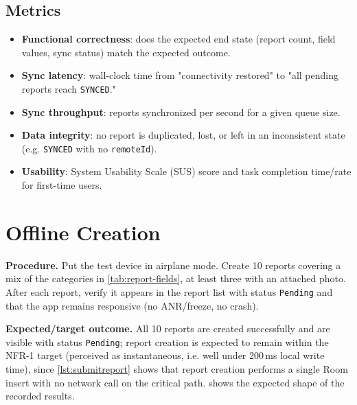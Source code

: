 \subsection{Metrics}

\begin{itemize}
  \item \textbf{Functional correctness}: does the expected end state
  (report count, field values, sync status) match the expected outcome.
  \item \textbf{Sync latency}: wall-clock time from "connectivity
  restored" to "all pending reports reach \texttt{SYNCED}."
  \item \textbf{Sync throughput}: reports synchronized per second for a
  given queue size.
  \item \textbf{Data integrity}: no report is duplicated, lost, or left in
  an inconsistent state (e.g. \texttt{SYNCED} with no \texttt{remoteId}).
  \item \textbf{Usability}: System Usability Scale (SUS) score
  \cite{brooke1996sus} and task completion time/rate for first-time
  users.
\end{itemize}

\section{Offline Creation}
\label{sec:eval-offline-creation}

\textbf{Procedure.} Put the test device in airplane mode. Create 10
reports covering a mix of the categories in \cref{tab:report-fields}, at
least three with an attached photo. After each report, verify it appears
in the report list with status \texttt{Pending} and that the app remains
responsive (no ANR/freeze, no crash).

\textbf{Expected/target outcome.} All 10 reports are created successfully
and are visible with status \texttt{Pending}; report creation is expected
to remain within the NFR-1 target (perceived as instantaneous, i.e. well
under 200\,ms local write time), since \cref{lst:submitreport} shows that
report creation performs a single Room insert with no network call on the
critical path.  shows the expected
shape of the recorded results.

